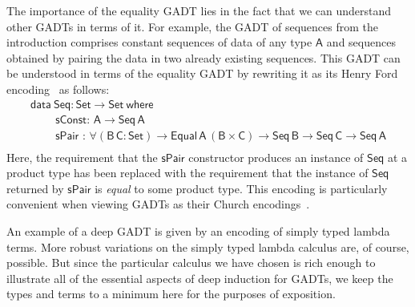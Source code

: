 \documentclass[9pt]{entcs}
\begin{document}
The importance of the equality GADT lies in the fact that we can
understand other GADTs in terms of it. For example, the GADT of
sequences from the introduction
comprises constant sequences of data of any type $\mathsf{A}$ and
sequences obtained by pairing the data in two already existing
sequences. This GADT can be understood in terms of the equality GADT
by rewriting it as its Henry Ford
encoding~\cite{ch03,hin03,mcb99,sjsv09,sp04} as follows:
\begin{equation}\label{eq:eq_seq}
\begin{array}{l}
\mathsf{data\ Seq : Set \to Set\ where}\\
\mathsf{\;\;\;\;\;\;\;\;sConst :\, A \to Seq\,A}\\ 
\mathsf{\;\;\;\;\;\;\;\;sPair\,\, :\, \forall (B\,C : Set) \to
  Equal\,A\,(B \times C) \to Seq\,B \to Seq\,C \to Seq\,A}\\ 
\end{array}
\end{equation}
Here, the requirement that the $\mathsf{sPair}$ constructor produces
an instance of $\mathsf{Seq}$ at a product type has been replaced with
the requirement that the instance of $\mathsf{Seq}$ returned by
$\mathsf{sPair}$ is \emph{equal} to some product type. This encoding
is particularly convenient when viewing GADTs as their Church
encodings~\cite{atk12,vw10}.

\vspace*{0.1in}

An example of a {\color{red} deep GADT} is given by an encoding of
simply typed lambda terms. More robust variations on the simply typed
lambda calculus are, of course, possible. But since the particular
calculus we have chosen is rich enough to illustrate all of the
essential aspects of deep induction for GADTs, we keep the types and
terms to a minimum here for the purposes of exposition.
\end{document}
